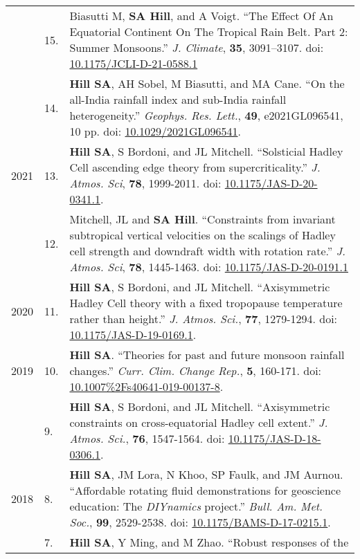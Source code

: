 \documentclass[letterpaper,11pt]{shillcv}
\begin{document}
\begin{longtable}{@{} Y{0.05\textwidth} >{\color{black}} p{0.04\textwidth} @{} L{0.91\textwidth} @{}}
     & 15. & Biasutti M, \textbf{SA Hill}, and A Voigt.  ``The Effect Of An Equatorial Continent On The Tropical Rain Belt. Part 2: Summer Monsoons.''  \emph{J. Climate}, \textbf{35}, 3091–3107.  doi: \href{https://doi.org/10.1175/JCLI-D-21-0588.1}{10.1175/JCLI-D-21-0588.1}\\
     & 14. & \textbf{Hill SA}, AH Sobel, M Biasutti, and MA Cane.  ``On the all-India rainfall index and sub-India rainfall heterogeneity.''  \emph{Geophys. Res. Lett.}, \textbf{49}, e2021GL096541, 10 pp.  doi: \href{https://doi.org/10.1029/2021GL096541}{10.1029/2021GL096541}.\\
2021 & 13. & \textbf{Hill SA}, S Bordoni, and JL Mitchell.  ``Solsticial Hadley Cell ascending edge theory from supercriticality.''  \emph{J. Atmos. Sci}, \textbf{78}, 1999-2011.  doi: \href{https://doi.org/10.1175/JAS-D-20-0341.1}{10.1175/JAS-D-20-0341.1}.\\
     & 12. & Mitchell, JL and \textbf{SA Hill}.  ``Constraints from invariant
subtropical vertical velocities on the scalings of Hadley cell strength and
downdraft width with rotation rate.''  \emph{J. Atmos. Sci}, \textbf{78}, 1445-1463.  doi: \href{https://doi.org/10.1175/JAS-D-20-0191.1}{10.1175/JAS-D-20-0191.1}\\
2020 & 11. & \textbf{Hill SA}, S Bordoni, and JL Mitchell.
``Axisymmetric Hadley Cell theory with a fixed tropopause temperature rather
than height.'' \emph{J. Atmos. Sci.}, \textbf{77}, 1279-1294.  doi: \href{https://doi.org/10.1175/JAS-D-19-0169.1}{10.1175/JAS-D-19-0169.1}.\\
2019 & 10. & \textbf{Hill SA}.  ``Theories for past and future monsoon rainfall
changes.'' \emph{Curr. Clim. Change Rep.}, \textbf{5}, 160-171.  doi: \href{https://doi.org/10.1007\%2Fs40641-019-00137-8}{10.1007\%2Fs40641-019-00137-8}.\\
     & 9. & \textbf{Hill SA}, S Bordoni, and JL Mitchell.
``Axisymmetric constraints on cross-equatorial Hadley cell extent.''
\emph{J. Atmos. Sci.}, \textbf{76}, 1547-1564.  doi: \href{https://doi.org/10.1175/JAS-D-18-0306.1}{10.1175/JAS-D-18-0306.1}.\\
2018 & 8. & \textbf{Hill SA}, JM Lora, N Khoo, SP Faulk, and
JM Aurnou.  ``Affordable rotating fluid demonstrations for
geoscience education: The \emph{DIYnamics} project.''  \emph{Bull.
Am. Met. Soc.}, \textbf{99}, 2529-2538.  doi: \href{https://doi.org/10.1175/BAMS-D-17-0215.1}{10.1175/BAMS-D-17-0215.1}.\\
     & 7. & \textbf{Hill SA}, Y Ming, and M Zhao.  ``Robust responses of the

\end{longtable}
\end{document}
